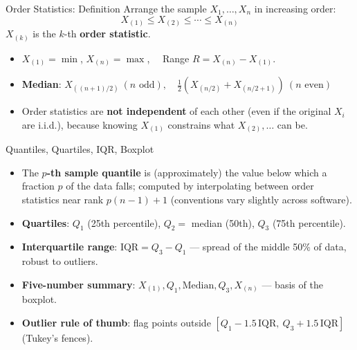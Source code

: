 \documentclass[11pt,aspectratio=169]{beamer}
\begin{document}
\begin{frame}{Order Statistics: Definition}
Arrange the sample $X_1,\dots,X_n$ in increasing order:
\[
    X_{(1)} \le X_{(2)} \le \cdots \le X_{(n)}
\]
$X_{(k)}$ is the $k$-th \textbf{order statistic}.

\begin{itemize}
    \item $X_{(1)}=\min$, $X_{(n)}=\max$, \ \ Range $R = X_{(n)}-X_{(1)}$.
    \item \textbf{Median}:
    $
        X_{((n+1)/2)}\ (n \text{ odd}), \quad
        \tfrac12\left(X_{(n/2)}+X_{(n/2+1)}\right)\ (n \text{ even})
    $
    \item Order statistics are \textbf{not independent} of each other
          (even if the original $X_i$ are i.i.d.), because knowing
          $X_{(1)}$ constrains what $X_{(2)},\dots$ can be.
\end{itemize}
\end{frame}

\begin{frame}{Quantiles, Quartiles, IQR, Boxplot}
\begin{itemize}
    \item The \textbf{$p$-th sample quantile} is (approximately) the value
          below which a fraction $p$ of the data falls; computed by
          interpolating between order statistics near rank $p(n-1)+1$
          (conventions vary slightly across software).
    \item \textbf{Quartiles}: $Q_1$ (25th percentile), $Q_2=$ median (50th),
          $Q_3$ (75th percentile).
    \item \textbf{Interquartile range}: $\text{IQR}=Q_3-Q_1$ — spread of the
          middle 50\% of data, robust to outliers.
    \item \textbf{Five-number summary}: $X_{(1)}, Q_1, \text{Median}, Q_3,
          X_{(n)}$ — basis of the boxplot.
    \item \textbf{Outlier rule of thumb}: flag points outside
          $[Q_1 - 1.5\,\text{IQR},\ Q_3 + 1.5\,\text{IQR}]$ (Tukey's fences).
\end{itemize}
\end{frame}
\end{document}
